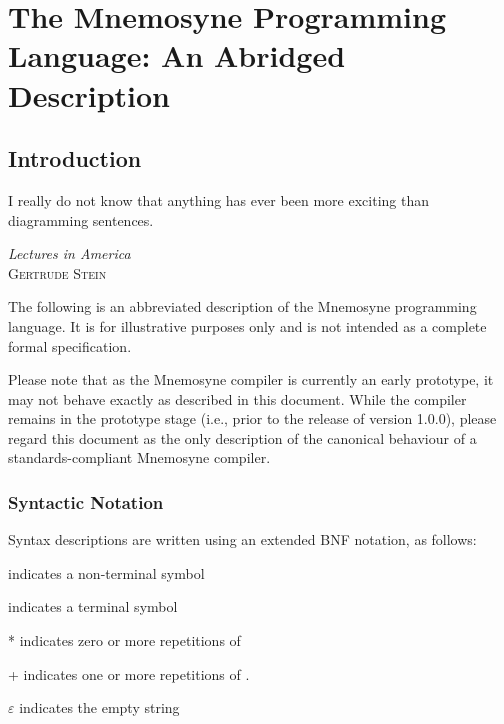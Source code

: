 %

\chapter{The Mnemosyne Programming Language: An Abridged Description}\label{app:spec}
\section{Introduction}
\epigraph{ I really do not know that anything has ever been more
           exciting than diagramming sentences. }%
         { \textit{Lectures in America} \\ \textsc{Gertrude Stein} }

\setlength{\grammarindent}{6em}

The following is an abbreviated description of the Mnemosyne programming language. It is for illustrative purposes only and is not intended as a complete formal specification.

Please note that as the Mnemosyne compiler is currently an early prototype, it may not behave exactly as described in this document. While the compiler remains in the prototype stage (i.e., prior to the release of version 1.0.0), please regard this document as the only description of the canonical behaviour of a standards-compliant Mnemosyne compiler.

\subsection{Syntactic Notation}
Syntax descriptions are written using an extended BNF notation, as follows:
\begin{description}[leftmargin=3cm,labelindent=\parindent]
    \item{} indicates a non-terminal symbol
    \item{} indicates a terminal symbol
    \item{* } indicates zero or more repetitions of 
    \item{+} indicates one or more repetitions of .
    \item{$\varepsilon$} indicates the empty string
\end{description}

